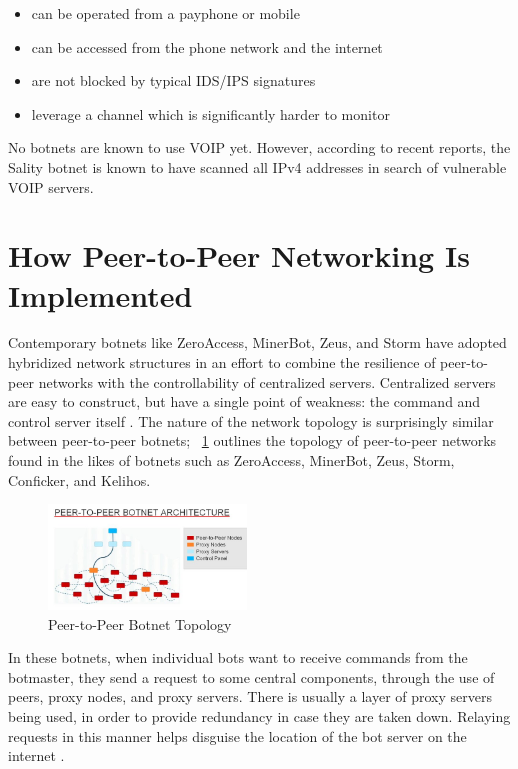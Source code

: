 \documentclass{acm_proc_article-sp}
\begin{document}
\begin{itemize}
\item can be operated from a payphone or mobile
\item can be accessed from the phone network and the internet
\item are not blocked by typical IDS/IPS signatures
\item leverage a channel which is significantly harder to monitor
\end{itemize}

No botnets are known to use VOIP yet.  However, according to recent reports, the Sality botnet is known to have scanned all IPv4 addresses in search of vulnerable VOIP servers\cite{sality:scan}.


\section{How Peer-to-Peer Networking Is Implemented}

Contemporary botnets like ZeroAccess, MinerBot, Zeus, and Storm have adopted hybridized network structures in an effort to combine the resilience of peer-to-peer networks with the controllability of centralized servers\cite{defcon:prowling}.  Centralized servers are easy to construct, but have a single point of weakness: the command and control server itself \cite{wang:p2p}.  The nature of the network topology is surprisingly similar between peer-to-peer botnets;  ~\ref{fig:p2p-architecture} outlines the topology of peer-to-peer networks found in the likes of botnets such as ZeroAccess, MinerBot, Zeus, Storm, Conficker, and Kelihos.

\begin{figure}[ht]\centering
\includegraphics[width=0.47\textwidth,natheight=640,natwidth=340]{p2p-architecture.jpg}
\caption{Peer-to-Peer Botnet Topology}
\label{fig:p2p-architecture}
\end{figure}

In these botnets, when individual bots want to receive commands from the botmaster, they send a request to some central components, through the use of peers, proxy nodes, and proxy servers. There is usually a layer of proxy servers being used, in order to provide redundancy in case they are taken down. Relaying requests in this manner helps disguise the location of the bot server on the internet \cite{defcon:prowling}.
\end{document}
